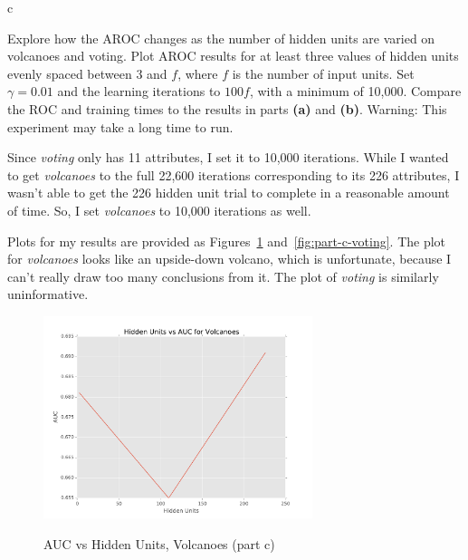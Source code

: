 \documentclass[fleqn]{homework}
\begin{document}
  \begin{problem}{c}
    \begin{question}
      Explore how the AROC changes as the number of hidden units are varied on
      volcanoes and voting.  Plot AROC results for at least three values of
      hidden units evenly spaced between 3 and $f$, where $f$ is the number of
      input units. Set $\gamma=0.01$ and the learning iterations to $100f$, with
      a minimum of 10,000.  Compare the ROC and training times to the results in
      parts \textbf{(a)} and \textbf{(b)}. Warning: This experiment may take a
      long time to run.
    \end{question}

    Since \textit{voting} only has 11 attributes, I set it to 10,000 iterations.
    While I wanted to get \textit{volcanoes} to the full 22,600 iterations
    corresponding to its 226 attributes, I wasn't able to get the 226 hidden
    unit trial to complete in a reasonable amount of time.  So, I set
    \textit{volcanoes} to 10,000 iterations as well.

    Plots for my results are provided as Figures~\ref{fig:part-c-volcanoes}
    and~\ref{fig:part-c-voting}.  The plot for \textit{volcanoes} looks like an
    upside-down volcano, which is unfortunate, because I can't really draw too
    many conclusions from it.  The plot of \textit{voting} is similarly
    uninformative.

    \begin{figure}
      \centering
      \caption{AUC vs Hidden Units, Volcanoes (part c)}
      \includegraphics[width=0.7\textwidth]{partc-volcanoes.pdf}
      \label{fig:part-c-volcanoes}
    \end{figure}


\end{problem}
\end{document}
